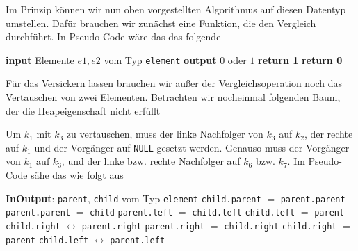 \documentclass[tikz,12pt]{article}
\begin{document}
Im Prinzip können wir nun oben vorgestellten Algorithmus auf diesen Datentyp umstellen.
Dafür brauchen wir zunächst eine Funktion, die den Vergleich durchführt. 
In Pseudo-Code wäre das das folgende
\begin{algorithmic}[1]
  \State\textbf{input} Elemente $e1, e2$ vom Typ \texttt{element}
  \State \textbf{output} $0$ oder $1$
  \State \textbf{return 1}
  \Else
  \State \textbf{return 0}
  \EndIf
  \EndProcedure
\end{algorithmic}
Für das Versickern lassen brauchen wir außer der Vergleichsoperation noch das Vertauschen von zwei Elementen. 
Betrachten wir nocheinmal folgenden Baum, der die Heapeigenschaft nicht erfüllt
\begin{center}
\end{center}
Um $k_1$ mit $k_3$ zu vertauschen, muss der linke Nachfolger von $k_3$ auf $k_2$, der rechte auf $k_1$ und der Vorgänger auf \texttt{NULL} gesetzt werden.
Genauso muss der Vorgänger von $k_1$ auf $k_3$, und der linke bzw. rechte Nachfolger auf $k_6$ bzw. $k_7$. 
Im Pseudo-Code sähe das wie folgt aus
\begin{algorithmic}[1]
  \State\textbf{InOutput}: \texttt{parent}, \texttt{child} vom Typ \texttt{element}
  \State \texttt{child.parent} $=$ \texttt{parent.parent}
  \State \texttt{parent.parent} $=$ \texttt{child}
  \State \texttt{parent.left} $=$ \texttt{child.left}
  \State \texttt{child.left} $=$ \texttt{parent}
  \State \texttt{child.right} $\leftrightarrow$ \texttt{parent.right}
  \Else
  \State \texttt{parent.right} $=$ \texttt{child.right}
  \State \texttt{child.right} $=$ \texttt{parent}
  \State \texttt{child.left} $\leftrightarrow$ \texttt{parent.left}
  \EndIf
  \EndProcedure
\end{algorithmic}
\end{document}
